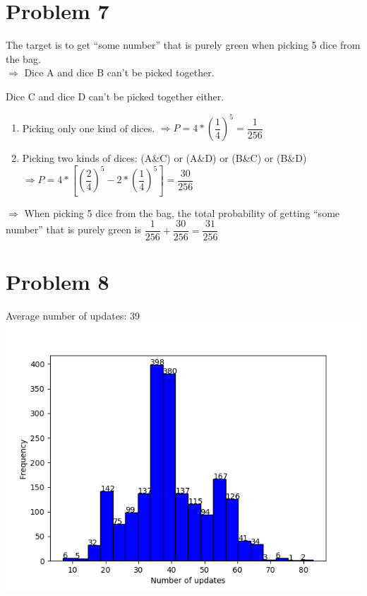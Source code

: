 \documentclass[12pt, a4paper]{article}
\begin{document}
\begin{CJK}{UTF8}{bkai}
	\section*{Problem 7}
		The target is to get “some number” that is purely green when picking 5 dice from the bag. \\ $\Rightarrow$ Dice A and dice B can't be picked together. \par
		Dice C and dice D can't be picked together either.
		\begin{enumerate}
		\item
			Picking only one kind of dices. $\Rightarrow P = 4 * (\dfrac{1}{4})^5 = \dfrac{1}{256}$
		\item
			Picking two kinds of dices: (A\&C) or (A\&D) or (B\&C) or (B\&D) \\
			$\Rightarrow P = 4*[(\dfrac{2}{4})^5 - 2 * (\dfrac{1}{4})^5] = \dfrac{30}{256} $
		\end{enumerate}
		$\Rightarrow$ When picking 5 dice from the bag, the total probability of getting “some number” that is purely green is $\dfrac{1}{256}+\dfrac{30}{256}=\dfrac{31}{256}$

	\section*{Problem 8}
		Average number of updates: 39 \\
		\includegraphics[width=14cm, keepaspectratio=true]{8.png} \par
	

\end{CJK}
\end{document}
